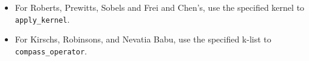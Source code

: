 \documentclass{article}
\begin{document}
\begin{itemize}
	\centering
	\item For Roberts, Prewitts, Sobels and Frei and Chen's, use the specified kernel to \texttt{apply\_kernel}.
	\item For Kirschs, Robinsons, and Nevatia Babu, use the specified k-list to \texttt{compass\_operator}.
\end{itemize}
\end{document}
